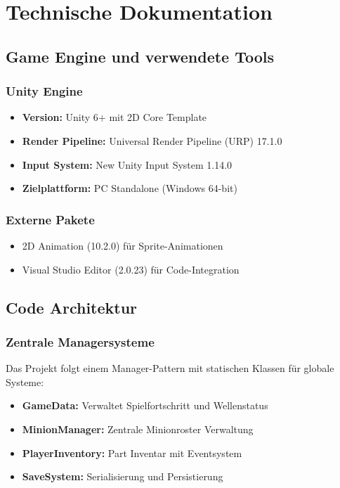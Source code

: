 \chapter{Technische Dokumentation}
\label{chap:technische_doku}

\section{Game Engine und verwendete Tools}

\subsection{Unity Engine}
\begin{itemize}
    \item \textbf{Version:} Unity 6+ mit 2D Core Template
    \item \textbf{Render Pipeline:} Universal Render Pipeline (URP) 17.1.0
    \item \textbf{Input System:} New Unity Input System 1.14.0
    \item \textbf{Zielplattform:} PC Standalone (Windows 64-bit)
\end{itemize}

\subsection{Externe Pakete}
\begin{itemize}
    \item 2D Animation (10.2.0) für Sprite-Animationen
    \item Visual Studio Editor (2.0.23) für Code-Integration
\end{itemize}

\section{Code Architektur}

\subsection{Zentrale Managersysteme}
Das Projekt folgt einem Manager-Pattern mit statischen Klassen für globale Systeme:

\begin{itemize}
    \item \textbf{GameData:} Verwaltet Spielfortschritt und Wellenstatus
    \item \textbf{MinionManager:} Zentrale Minionroster Verwaltung
    \item \textbf{PlayerInventory:} Part Inventar mit Eventsystem
    \item \textbf{SaveSystem:} Serialisierung und Persistierung
\end{itemize}

